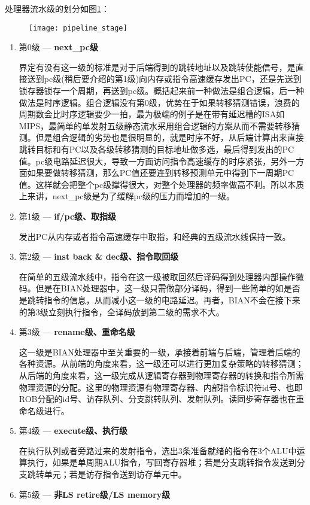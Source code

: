 处理器流水级的划分如图\ref{fig:my_pipeline}：
\begin{figure}[!htbp]
	\texttt{[image: pipeline\_stage]}
	\label{fig:my_pipeline}
\end{figure}
\begin{enumerate}[label=(\alph*)]
	\item 第0级 --- \textbf{next\_pc级}
	
	界定有没有这一级的标准是对于后端得到的跳转地址以及跳转使能信号，是直接送到pc级(稍后要介绍的第1级)向内存或指令高速缓存发出PC，还是先送到锁存器锁存一个周期，再送到pc级。概括起来前一种做法是组合逻辑，后一种做法是时序逻辑。组合逻辑没有第0级，优势在于如果转移猜测错误，浪费的周期数会比时序逻辑要少一拍，最为极端的例子是在带有延迟槽的ISA如MIPS，最简单的单发射五级静态流水采用组合逻辑的方案从而不需要转移猜测。但是组合逻辑的劣势也是很明显的，就是时序不好，从后端计算出来直接跳转目标和有PC以及各级转移猜测的目标地址做多选，最后得到发出的PC值。pc级电路延迟很大，导致一方面访问指令高速缓存的时序紧张，另外一方面如果要做转移猜测，那么PC值还要连到转移预测单元中得到下一周期PC值。这样就会把整个pc级撑得很大，对整个处理器的频率做高不利。所以本质上来讲，next\_pc级是为了缓解pc级的压力而增加的一级。
	\item 第1级 --- \textbf{if/pc级、取指级}
	
	发出PC从内存或者指令高速缓存中取指，和经典的五级流水线保持一致。
	\item 第2级 --- \textbf{inst back \& dec级、指令取回级}
	
	在简单的五级流水线中，指令在这一级被取回然后译码得到处理器内部操作微码。但是在BIAN处理器中，这一级只需做部分译码，得到一些简单的如是否是跳转指令的信息，从而减小这一级的电路延迟。再者，BIAN不会在接下来的第3级立刻执行指令，全译码放到第二级的需求不大。
	\item 第3级 --- \textbf{rename级、重命名级}
	
	这一级是BIAN处理器中至关重要的一级，承接着前端与后端，管理着后端的各种资源。从前端的角度来看，这一级还可以进行更加复杂策略的转移猜测；从后端的角度来看，这一级完成从逻辑寄存器到物理寄存器的转换和指令所需物理资源的分配。这里的物理资源有物理寄存器、内部指令标识符id号、也即ROB分配的id号、访存队列、分支跳转队列、发射队列。读同步寄存器也在重命名级进行。
	\item 第4级 --- \textbf{execute级、执行级}
	
	在执行队列或者旁路过来的发射指令，选出3条准备就绪的指令在3个ALU中运算执行，如果是单周期ALU指令，写回寄存器堆；若是分支跳转指令发送到分支跳转单元；若是访存指令送到访存单元中。
	\item 第5级 --- \textbf{非LS retire级/LS memory级}


\end{enumerate}
